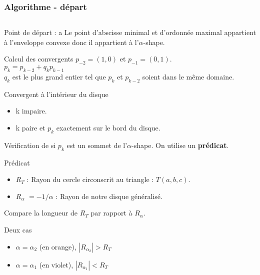\begin{frame}
\frametitle{Algorithme - départ}

\begin{columns}[t]
  \begin{column}{0.7\linewidth}
    {
      \begin{block}{Point de départ : a}
        Le point d'abscisse minimal et d'ordonnée maximal appartient à l'enveloppe convexe donc il appartient à l'$\alpha$-shape.\\
      \end{block}
    }
    {  
      \begin{block}{Calcul des convergents}
        $p_{-2} = (1,0)$ et $p_{-1} = (0,1)$.\\
        $p_{k} = p_{k-2} + q_k p_{k-1}$\\
        $q_k$ est le plus grand entier tel que $p_{k}$ et $p_{k-2}$ soient dans le même domaine.
      \end{block}
    }
    {
      \begin{block}{Convergent à l'intérieur du disque}
        \begin{itemize}
          \item k impaire.
          \item k paire et $p_k$ exactement sur le bord du disque.
        \end{itemize}
        Vérification de si $p_k$ est un sommet de l'$\alpha$-shape.
        On utilise un \textbf{prédicat}.
      \end{block}
    }
    {
      \begin{block}{Prédicat}
      \begin{itemize}
        \item \textbf{$R_T$} : Rayon du cercle circonscrit au triangle : $T(a, b, c)$.
        \item \textbf{$R_{\alpha}$} $= -1/\alpha$ : Rayon de notre disque généralisé.
      \end{itemize}      
        Compare la longueur de \textbf{$R_T$} par rapport à \textbf{$R_{\alpha}$}.\\
      \end{block}
      
      \begin{alertblock}{Deux cas}
        \begin{itemize}
          \item $\alpha = \alpha_{2}$ (en orange), \textbf{$|R_{\alpha_{2}}| > R_T$}
          \item $\alpha = \alpha_{1}$ (en violet), \textbf{$|R_{\alpha_{1}}| < R_T$}
        \end{itemize}
       \end{alertblock}
    }


\end{column}
\end{columns}
\end{frame}
